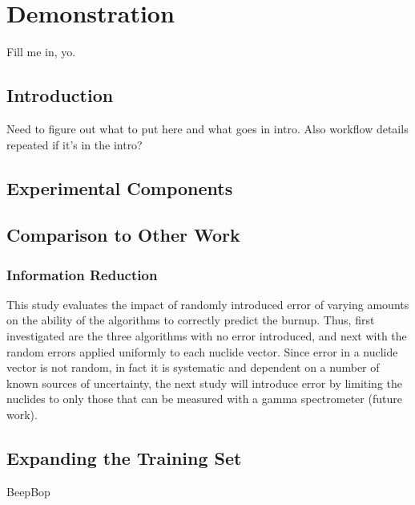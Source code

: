 \chapter{Demonstration}
\label{ch:demo}

Fill me in, yo.

\section{Introduction}
\label{sec:demointro}

Need to figure out what to put here and what goes in intro. Also workflow
details repeated if it's in the intro?

\section{Experimental Components}




\section{Comparison to Other Work}
\label{sec:compare}

\subsection{Information Reduction}

This study evaluates the impact of randomly introduced error of varying amounts
on the ability of the algorithms to correctly predict the burnup. Thus, first
investigated are the three algorithms with no error introduced, and next with
the random errors applied uniformly to each nuclide vector. Since error in a
nuclide vector is not random, in fact it is systematic and dependent on a
number of known sources of uncertainty, the next study will introduce error by
limiting the nuclides to only those that can be measured with a gamma
spectrometer (future work).

\section{Expanding the Training Set}
\label{sec:newtrain}

BeepBop
